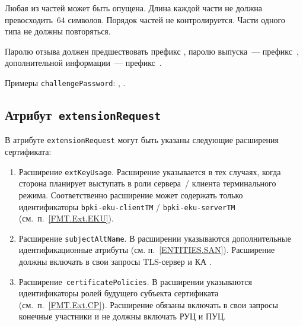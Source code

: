 Любая из частей может быть опущена. Длина каждой части не должна 
превосходить~$64$ символов. Порядок частей не контролируется.
Части одного типа не должны повторяться.

Паролю отзыва должен предшествовать префикс 
, паролю выпуска~--- префикс~,
дополнительной информации~--- префикс~.

Примеры \texttt{challengePassword}:
, .

\subsection{Атрибут~\texttt{extensionRequest}}\label{FMT.CSR.ER}

В атрибуте \texttt{extensionRequest} могут быть указаны следующие 
расширения сертификата:

\begin{enumerate}
\item 
Расширение \texttt{extKeyUsage}. Расширение указывается в тех случаях, 
когда сторона планирует выступать в роли сервера~/ клиента терминального 
режима. Соответственно расширение может содержать только идентификаторы  
\verb|bpki-eku-clientTM| / \verb|bpki-eku-serverTM| 
(см.~п.~\ref{FMT.Ext.EKU}). 


\item 
Расширение \texttt{subjectAltName}. В расширении указываются 
дополнительные идентификационные атрибуты (см. п.~\ref{ENTITIES.SAN}). 
Расширение должны включать в свои запросы TLS-сервер и КА 
.


\item
Расширение~\texttt{certificatePolicies}. В расширении
указываются идентификаторы ролей будущего субъекта сертификата
(см.~п.~\ref{FMT.Ext.CP}).
Расширение обязаны включать в свои запросы конечные участники 
и не должны включать РУЦ и ПУЦ.
\end{enumerate}

